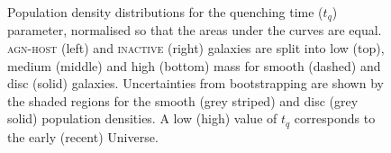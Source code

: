 \begin{figure}
\caption[Quenching time population density distributions for the \textsc{agn-host} and \textsc{inactive} samples] {Population density distributions for the quenching time ($t_q$) parameter, normalised so that the areas under the curves are equal. \textsc{agn-host} (left) and \textsc{inactive} (right) galaxies are split into low (top), medium (middle) and high (bottom) mass for smooth (dashed) and disc (solid) galaxies. Uncertainties from bootstrapping are shown by the shaded regions for the smooth (grey striped) and disc (grey solid) population densities. A low (high) value of $t_q$ corresponds to the early (recent) Universe.}
\label{time}
\end{figure}



